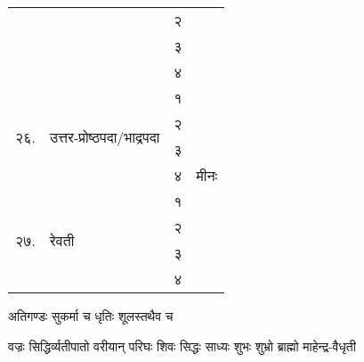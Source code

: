 \begin{longtable}{|l@{~}l|>{\tiny}c|c|}
  &                                        & २            &                         \\*
  &                                        & ३            &                         \\*
  \cline{3-4}                     &                                        & ४            & \multirow{9}{*}{मीनः}   \\*
  \cline{1-3}\multirow{4}{*}{२६.} & \multirow{4}{*}{उत्तर-प्रोष्ठपदा/भाद्रपदा} & १            &                         \\*
  &                                        & २            &                         \\*
  &                                        & ३            &                         \\*
  &                                        & ४            &                         \\*
  \cline{1-3}\multirow{4}{*}{२७.} & \multirow{4}{*}{रेवती}                  & १            &                         \\*
  &                                        & २            &                         \\*
  &                                        & ३            &                         \\*
  &                                        & ४            &                         \\\hline
\end{longtable}
\endgroup


{अतिगण्डः सुकर्मा च धृतिः शूलस्तथैव च}

{वज्रः सिद्धिर्व्यतीपातो वरीयान् परिघः शिवः}
{सिद्धः साध्यः शुभः शुभ्रो ब्राह्मो माहेन्द्र-वैधृती}


